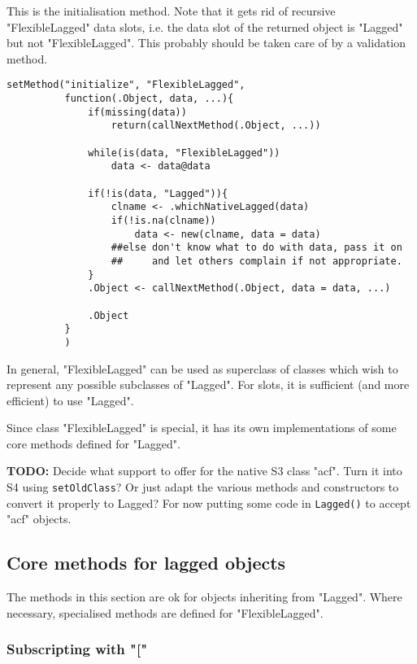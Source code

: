\documentclass[11pt,a4paper]{article}
\begin{document}
This is the initialisation method. Note that it gets rid of recursive "FlexibleLagged" data
slots, i.e. the data slot of the returned object is "Lagged" but not "FlexibleLagged".
This probably should be taken care of by a validation method.
\begin{verbatim}
setMethod("initialize", "FlexibleLagged",
          function(.Object, data, ...){
              if(missing(data))
                  return(callNextMethod(.Object, ...))

              while(is(data, "FlexibleLagged"))
                  data <- data@data

              if(!is(data, "Lagged")){
                  clname <- .whichNativeLagged(data)
                  if(!is.na(clname))
                      data <- new(clname, data = data)
                  ##else don't know what to do with data, pass it on
                  ##     and let others complain if not appropriate.
              }
              .Object <- callNextMethod(.Object, data = data, ...)

              .Object
          }
          )
\end{verbatim}
In general, "FlexibleLagged" can be used as superclass of classes which wish to represent any
possible subclasses of "Lagged". For slots, it is sufficient (and more efficient) to use
"Lagged".

Since class "FlexibleLagged" is special, it has its own implementations of some core methods
defined for "Lagged".

\textbf{TODO:} Decide what support to offer for the native S3 class "acf". Turn it into S4 using
\texttt{setOldClass}? Or just adapt the various methods and constructors to convert it properly to
Lagged? For now putting some code in \texttt{Lagged()} to accept "acf" objects.

\subsection{Core methods for lagged objects}
\label{sec:orga857797}

The methods in this section are ok for objects inheriting from "Lagged". Where
necessary, specialised methods are defined for "FlexibleLagged".


\subsubsection{Subscripting with "["}
\label{sec:org31709fe}
\end{document}
